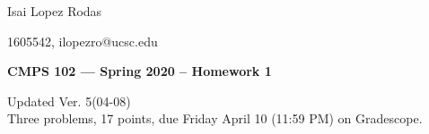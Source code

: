 \documentclass[11pt]{article}
\begin{document}
\hfill Isai  Lopez Rodas  

\hfill 1605542, ilopezro@ucsc.edu

\begin{center}
{\bf\Large 
CMPS 102 --- Spring 2020 --  Homework 1 }
\end{center}

\begin{center}
Updated Ver. 5(04-08)\\
Three problems, 17 points, due Friday April 10 (11:59 PM) on Gradescope. 
\end{center}

\end{document}
